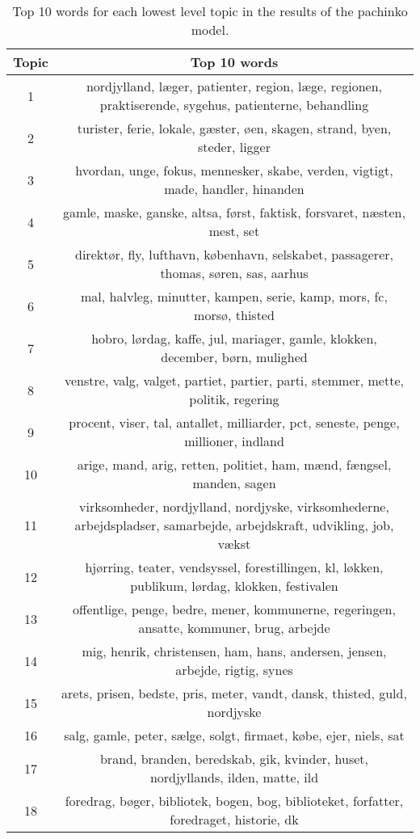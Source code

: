 \begin{longtable}[c]{c | c}
		\caption{Top 10 words for each lowest level topic in the results of the pachinko model. \label{tab:pachinko_topics}}\\
		Topic & Top 10 words \\
		\hline
		\endfirsthead
		1 & nordjylland, læger, patienter, region, læge, regionen, praktiserende, sygehus, patienterne, behandling \\
		2 & turister, ferie, lokale, gæster, øen, skagen, strand, byen, steder, ligger \\
		3 & hvordan, unge, fokus, mennesker, skabe, verden, vigtigt, made, handler, hinanden \\
		4 & gamle, maske, ganske, altsa, først, faktisk, forsvaret, næsten, mest, set \\
		5 & direktør, fly, lufthavn, københavn, selskabet, passagerer, thomas, søren, sas, aarhus \\
		6 & mal, halvleg, minutter, kampen, serie, kamp, mors, fc, morsø, thisted \\
		7 & hobro, lørdag, kaffe, jul, mariager, gamle, klokken, december, børn, mulighed \\
		8 & venstre, valg, valget, partiet, partier, parti, stemmer, mette, politik, regering \\
		9 & procent, viser, tal, antallet, milliarder, pct, seneste, penge, millioner, indland \\
		10 & arige, mand, arig, retten, politiet, ham, mænd, fængsel, manden, sagen \\
		11 & virksomheder, nordjylland, nordjyske, virksomhederne, arbejdspladser, samarbejde, arbejdskraft, udvikling, job, vækst \\
		12 & hjørring, teater, vendsyssel, forestillingen, kl, løkken, publikum, lørdag, klokken, festivalen \\
		13 & offentlige, penge, bedre, mener, kommunerne, regeringen, ansatte, kommuner, brug, arbejde \\
		14 & mig, henrik, christensen, ham, hans, andersen, jensen, arbejde, rigtig, synes \\
		15 & arets, prisen, bedste, pris, meter, vandt, dansk, thisted, guld, nordjyske \\
		16 & salg, gamle, peter, sælge, solgt, firmaet, købe, ejer, niels, sat \\
		17 & brand, branden, beredskab, gik, kvinder, huset, nordjyllands, ilden, matte, ild \\
		18 & foredrag, bøger, bibliotek, bogen, bog, biblioteket, forfatter, foredraget, historie, dk \\

\end{longtable}
